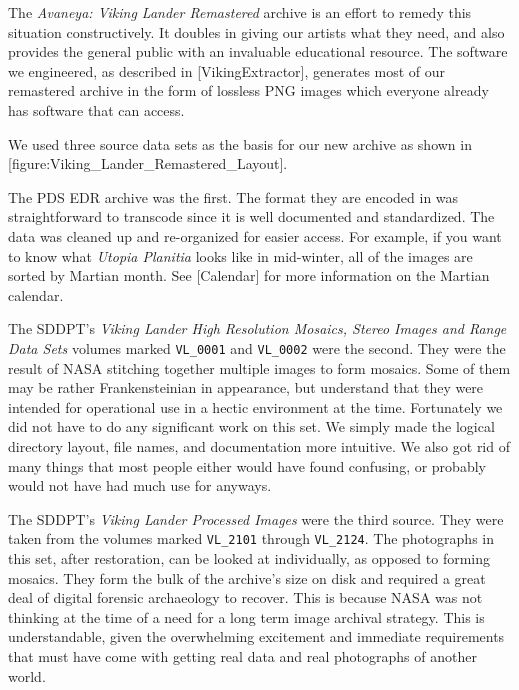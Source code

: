 The {\it Avaneya: Viking Lander Remastered} archive is an effort to remedy this situation constructively. It doubles in giving our artists what they need, and also provides the general public with an invaluable educational resource. The software we engineered, as described in [VikingExtractor], generates most of our remastered archive in the form of lossless PNG images which everyone already has software that can access.

We used three source data sets as the basis for our new archive as shown in [figure:Viking_Lander_Remastered_Layout].
\crlf

    {}

The PDS EDR archive was the first. The format they are encoded in was straightforward to transcode since it is well documented and standardized. The data was cleaned up and re-organized for easier access. For example, if you want to know what {\it Utopia Planitia} looks like in mid-winter, all of the images are sorted by Martian month. See [Calendar] for more information on the Martian calendar.

The SDDPT's {\it Viking Lander High Resolution Mosaics, Stereo Images and Range Data Sets} volumes marked {\tt VL_0001} and {\tt VL_0002} were the second. They were the result of NASA stitching together multiple images to form mosaics. Some of them may be rather Frankensteinian in appearance, but understand that they were intended for operational use in a hectic environment at the time. Fortunately we did not have to do any significant work on this set. We simply made the logical directory layout, file names, and documentation more intuitive. We also got rid of many things that most people either would have found confusing, or probably would not have had much use for anyways.

The SDDPT's {\it Viking Lander Processed Images} were the third source. They were taken from the volumes marked {\tt VL_2101} through {\tt VL_2124}. The photographs in this set, after restoration, can be looked at individually, as opposed to forming mosaics. They form the bulk of the archive's size on disk and required a great deal of digital forensic archaeology to recover. This is because NASA was not thinking at the time of a need for a long term image archival strategy. This is understandable, given the overwhelming excitement and immediate requirements that must have come with getting real data and real photographs of another world.

